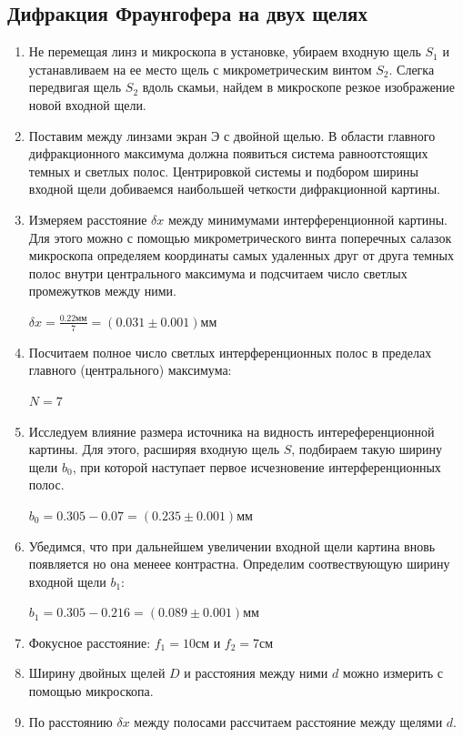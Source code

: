 \documentclass[a4paper,12pt]{article}
\begin{document}
\subsection{Дифракция Фраунгофера на двух щелях}
\begin{enumerate}
    \item Не перемещая линз и микроскопа в установке, убираем входную щель $S_1$ и устанавливаем на ее место щель с микрометрическим винтом $S_2$. Слегка передвигая щель $S_2$ вдоль скамьи, найдем в микроскопе резкое изображение новой входной щели.
    \item Поставим между линзами экран Э с двойной щелью. В области главного дифракционного максимума должна появиться система равноотстоящих темных и светлых полос. Центрировкой системы и подбором ширины входной щели добиваемся наибольшей четкости дифракционной картины.
    \item Измеряем расстояние $\delta x$ между минимумами интерференционной картины. Для этого можно с помощью микрометрического винта поперечных салазок микроскопа определяем координаты самых удаленных друг от друга темных полос внутри центрального максимума и подсчитаем число светлых промежутков между ними.

    $\delta x = \frac{0.22\text{мм}}{7}=(0.031\pm0.001)\text{мм}$
    \item Посчитаем полное число светлых интерференционных полос в пределах главного (центрального) максимума:

    $N =7$
    \item Исследуем влияние размера источника на видность интереференционной картины. Для этого, расширяя входную щель $S$, подбираем такую ширину щели $b_0$, при которой наступает первое исчезновение интерференционных полос.

    $b_0 = 0.305-0.07=(0.235\pm0.001)\text{мм}$
    \item Убедимся, что при дальнейшем увеличении входной щели картина вновь появляется но она менеее контрастна. Определим соотвествующую ширину входной щели $b_1$:

    $b_1 = 0.305-0.216 = (0.089\pm0.001)\text{мм}$
    \item Фокусное расстояние: $f_1 = 10\text{см}$ и $f_2=7\text{см}$
    \item Ширину двойных щелей $D$ и расстояния между ними $d$ можно измерить с помощью микроскопа.
    \item По расстоянию $\delta x$ между полосами рассчитаем расстояние между щелями $d$.


\end{enumerate}
\end{document}
